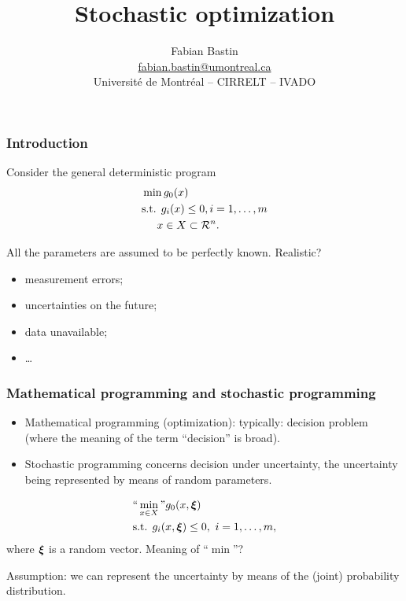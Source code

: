 \documentclass{beamer}
\title[Stochastic optimization]{Stochastic optimization}
\author[Fabian Bastin]{Fabian Bastin \\ \url{fabian.bastin@umontreal.ca} \\ Université de Montréal -- CIRRELT -- IVADO}
\date{}
\def\red{\color{red}}
\begin{document}
\frame{\titlepage}

\begin{frame}
\frametitle{Introduction}

Consider the general deterministic program
\[
\begin{split}
& \min g_0(x) \\
& \text{s.t. }g_i(x) \leq 0, i = 1,\ldots{},m \\
& \phantom{t.q. }x \in X \subset {\mathcal{R}}^n.
\end{split}
\]

\mbox{}

All the parameters are assumed to be perfectly known. {\color{red} Realistic?}
\begin{itemize}
\item
measurement errors;
\item
uncertainties on the future;
\item
data unavailable;
\item
\ldots
\end{itemize}

\end{frame}

\begin{frame}
\frametitle{Mathematical programming and stochastic programming}

\begin{itemize}
\item
{\red Mathematical programming} (optimization): typically: decision problem (where the meaning of the term ``decision'' is broad).
\item
{\red Stochastic programming} concerns decision under uncertainty, the uncertainty being represented by means of random parameters.
\end{itemize}
\[
\begin{split}
& ``\min_{x \in X}" g_0(x,{\boldsymbol{\xi}}) \\
& \text{s.t. }g_i(x, {\boldsymbol{\xi}}) \leq 0,\ i=1,\ldots{},m,\\
\end{split}
\]
where ${\boldsymbol{\xi}}$ is a random vector. Meaning of ``$\min$''?

\mbox{}

{\red Assumption}: we can represent the uncertainty by means of the (joint) probability distribution.

\end{frame}
\end{document}
